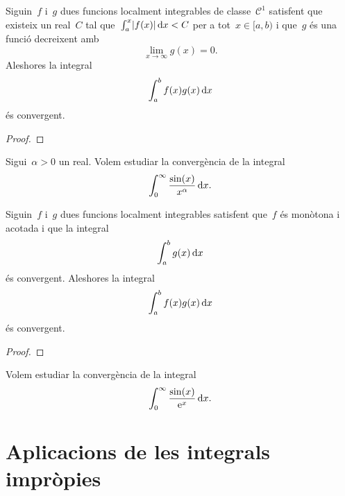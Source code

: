 \documentclass[../../main.tex]{subfiles}
\begin{document}
	\begin{theorem}
		\label{thm:criteri de Dirichlet per integrals impròpies}
		Siguin~\(f\) i~\(g\) dues funcions localment integrables de classe~\(\mathcal{C}^{1}\) satisfent que existeix un real~\(C\) tal que~\(\int_{a}^{x}\abs{f(x)}\diff x<C\) per a tot~\(x\in[a,b)\) i que~\(g\) és una funció decreixent amb
		\[
		    \lim_{x\to\infty}g(x)=0.
		\]
		Aleshores la integral
		\[
		    \int_{a}^{b}f(x)g(x)\mathop{}\!\mathrm{d} x
		\]
		és convergent.
		\begin{proof}
		\end{proof}
	\end{theorem}
	\begin{example}
		Sigui~\(\alpha>0\) un real.
		Volem estudiar la convergència de la integral
		\[
		    \int_{0}^{\infty}\frac{\sin(x)}{x^{\alpha}}\mathop{}\!\mathrm{d} x.
		\]
		\begin{solution}
		\end{solution}
	\end{example}
	\begin{theorem}
		\label{thm:criteri d'Abel per integrals impròpies}
		Siguin~\(f\) i~\(g\) dues funcions localment integrables satisfent que~\(f\) és monòtona i acotada i que la integral
		\[
		    \int_{a}^{b}g(x)\mathop{}\!\mathrm{d} x
		\]
		és convergent.
		Aleshores la integral
		\[
		    \int_{a}^{b}f(x)g(x)\mathop{}\!\mathrm{d} x
		\]
		és convergent.
		\begin{proof}
		\end{proof}
	\end{theorem}
	\begin{example}
		\label{ex:criteri d'Abel per integrals impròpies}
		Volem estudiar la convergència de la integral
		\[
		    \int_{0}^{\infty}\frac{\sin(x)}{\mathrm{e}^{x}}\mathop{}\!\mathrm{d} x.
		\]
		\begin{solution}
		\end{solution}
	\end{example}
\section{Aplicacions de les integrals impròpies}
\end{document}
